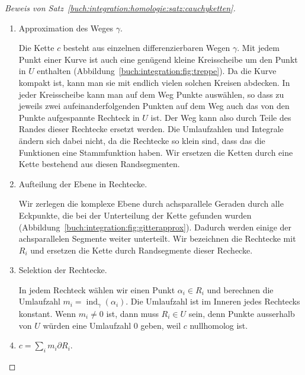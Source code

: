 \begin{proof}[Beweis von Satz~\ref{buch:integration:homologie:satz:cauchyketten}]
\begin{enumerate}
\item
Approximation des Weges $\gamma$.

Die Kette $c$ besteht aus einzelnen differenzierbaren Wegen $\gamma$.
Mit jedem Punkt einer Kurve ist auch eine genügend kleine Kreisscheibe
um den Punkt in $U$ enthalten (Abbildung~\ref{buch:integration:fig:treppe}).
Da die Kurve kompakt ist, kann man sie mit endlich vielen solchen Kreisen
abdecken.
In jeder Kreisscheibe kann man auf dem Weg Punkte auswählen, so dass 
zu jeweils zwei aufeinanderfolgenden Punkten auf dem Weg auch das von
den Punkte aufgespannte Rechteck in $U$ ist.
Der Weg kann also durch Teile des Randes dieser Rechtecke ersetzt werden.
Die Umlaufzahlen und Integrale ändern sich dabei nicht, da die 
Rechtecke so klein sind, dass das die Funktionen eine Stammfunktion haben.
Wir ersetzen die Ketten durch eine Kette bestehend aus diesen Randsegmenten.

\item
Aufteilung der Ebene in Rechtecke.

Wir zerlegen die komplexe Ebene durch achsparallele Geraden durch
alle Eckpunkte, die bei der Unterteilung der Kette gefunden wurden
(Abbildung~\ref{buch:integration:fig:gitterapprox}).
Dadurch werden einige der achsparallelen Segmente weiter unterteilt.
Wir bezeichnen die Rechtecke mit $R_i$ und ersetzen die Kette
durch Randsegmente dieser Rechecke.

\item
Selektion der Rechtecke.

In jedem Rechteck wählen wir einen Punkt $\alpha_i\in R_i$ und berechnen
die Umlaufzahl $m_i=\operatorname{ind}_\gamma(\alpha_i)$.
Die Umlaufzahl ist im Inneren jedes Rechtecks konstant.
Wenn $m_i\ne 0$ ist, dann muss $R_i\in U$ sein, denn Punkte ausserhalb
von $U$ würden eine Umlaufzahl $0$ geben, weil $c$ nullhomolog ist.

\item $\displaystyle c=\sum_i m_i\partial R_i$.




\end{enumerate}
\end{proof}

